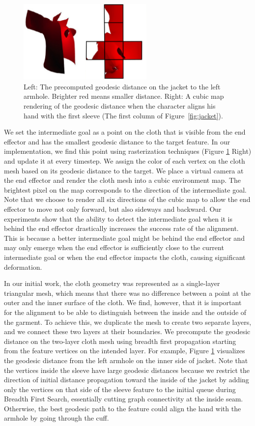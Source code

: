 \begin{figure}[!t]
  \centering
  \includegraphics[width=2.6in]{images/geodesic}
  \caption{Left: The precomputed geodesic distance on the jacket to the left armhole. Brighter red means smaller distance. Right: A cubic map rendering of the geodesic distance when the character aligns his hand with the first sleeve (The first column of Figure~\ref{fig:jacket}).}
  \label{fig:geodesic}
\end{figure}


We set the intermediate goal as a point on the cloth that is visible from
the end effector and has the smallest geodesic distance to the target
feature. In our implementation, we find this point using rasterization
techniques (Figure \ref{fig:geodesic} Right) and update it at every timestep. We assign the color of
each vertex on the cloth mesh based on its geodesic distance to the target. We
place a virtual camera at the end effector and render the cloth mesh into
a cubic environment map. The brightest pixel on the map corresponds to the
direction of the intermediate goal. Note that we choose to render all six
directions of the cubic map to allow the end effector to move not only
forward, but also sideways and backward. Our experiments show that the
ability to detect the intermediate goal when it is behind the end effector
drastically increases the success rate of the alignment. This is because a
better intermediate goal might be behind the end effector and may only
emerge when the end effector is sufficiently close to the current
intermediate goal or when the end effector impacts the cloth, causing
significant deformation.

In our initial work, the cloth geometry was represented as a single-layer triangular mesh, which means that there was no difference between a point at the outer and the inner surface of the cloth. We find, however, that it is important for the alignment to be able to distinguish between the inside and the outside of the garment.  To achieve this, we duplicate the mesh to create two separate layers, and we connect these two layers at their boundaries. We precompute the geodesic distance on the two-layer cloth mesh using breadth first propagation starting from the feature vertices on the intended layer. For example, Figure \ref{fig:geodesic} visualizes the geodesic distance from the left armhole on the inner side of jacket. Note that the vertices inside the sleeve have large geodesic distances because we restrict the direction of initial distance propagation toward the inside of the jacket by adding only the vertices on that side of the sleeve feature to the initial queue during Breadth First Search, essentially cutting graph connectivity at the inside seam. Otherwise, the best geodesic path to the feature could align the hand with the armhole by going through the cuff.

